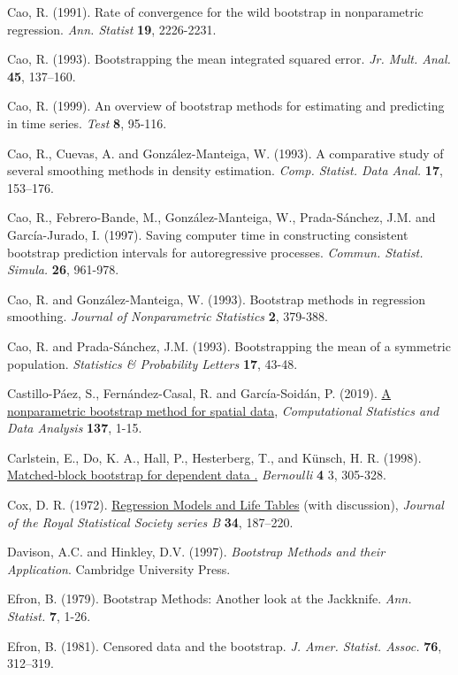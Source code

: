 \documentclass[]{book}
\theoremstyle{definition}
\theoremstyle{definition}
\theoremstyle{definition}
\theoremstyle{remark}
\begin{document}
Cao, R. (1991). Rate of convergence for the wild bootstrap in
nonparametric regression. \emph{Ann. Statist} \textbf{19}, 2226-2231.

Cao, R. (1993). Bootstrapping the mean integrated squared error.
\emph{Jr. Mult. Anal.} \textbf{45}, 137--160.

Cao, R. (1999). An overview of bootstrap methods for estimating and
predicting in time series. \emph{Test} \textbf{8}, 95-116.

Cao, R., Cuevas, A. and González-Manteiga, W. (1993). A comparative
study of several smoothing methods in density estimation. \emph{Comp.
Statist. Data Anal.} \textbf{17}, 153--176.

Cao, R., Febrero-Bande, M., González-Manteiga, W., Prada-Sánchez, J.M.
and García-Jurado, I. (1997). Saving computer time in constructing
consistent bootstrap prediction intervals for autoregressive processes.
\emph{Commun. Statist. Simula.} \textbf{26}, 961-978.

Cao, R. and González-Manteiga, W. (1993). Bootstrap methods in
regression smoothing. \emph{Journal of Nonparametric Statistics}
\textbf{2}, 379-388.

Cao, R. and Prada-Sánchez, J.M. (1993). Bootstrapping the mean of a
symmetric population. \emph{Statistics \& Probability Letters}
\textbf{17}, 43-48.

Castillo-Páez, S., Fernández-Casal, R. and García-Soidán, P. (2019).
\href{https://www.sciencedirect.com/science/article/pii/S0167947319300325?via\%3Dihub}{A
nonparametric bootstrap method for spatial data}, \emph{Computational
Statistics and Data Analysis} \textbf{137}, 1-15.

Carlstein, E., Do, K. A., Hall, P., Hesterberg, T., and Künsch, H. R.
(1998).
\href{https://projecteuclid.org/euclid.bj/1174324983}{Matched-block
bootstrap for dependent data .} \emph{Bernoulli} \textbf{4} 3, 305-328.

Cox, D. R. (1972).
\href{https://rss.onlinelibrary.wiley.com/doi/abs/10.1111/j.2517-6161.1972.tb00899.x}{Regression
Models and Life Tables} (with discussion), \emph{Journal of the Royal
Statistical Society series B} \textbf{34}, 187--220.

Davison, A.C. and Hinkley, D.V. (1997). \emph{Bootstrap Methods and
their Application}. Cambridge University Press.

Efron, B. (1979). Bootstrap Methods: Another look at the Jackknife.
\emph{Ann. Statist.} \textbf{7}, 1-26.

Efron, B. (1981). Censored data and the bootstrap. \emph{J. Amer.
Statist. Assoc.} \textbf{76}, 312--319.
\end{document}
